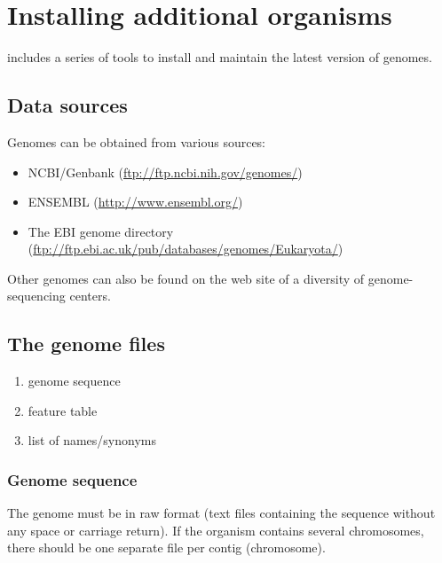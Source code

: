 
\section{Installing additional organisms}

\RSAT includes a series of tools to install and maintain the latest
version of genomes.

\subsection{Data sources}

Genomes can be obtained from various sources:
\begin{itemize}
\item NCBI/Genbank (\url{ftp://ftp.ncbi.nih.gov/genomes/})

\item ENSEMBL (\url{http://www.ensembl.org/})

\item The EBI genome directory (\url{ftp://ftp.ebi.ac.uk/pub/databases/genomes/Eukaryota/})

\end{itemize}

Other genomes can also be found on the web site of a diversity of
genome-sequencing centers.


\subsection{The genome files}


\begin{enumerate}
\item genome sequence
\item feature table
\item list of names/synonyms
\end{enumerate}

\subsubsection{Genome sequence} 

The genome must be in raw format (text files containing the sequence
without any space or carriage return). If the organism contains
several chromosomes, there should be one separate file per contig
(chromosome). 

